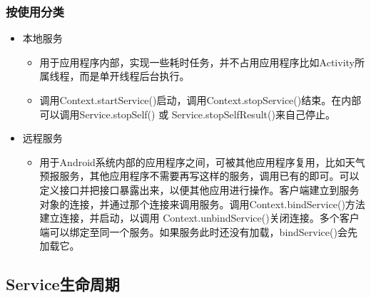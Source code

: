 \documentclass[9pt, b5paper]{article}
\begin{document}
\subsubsection{按使用分类　　}
\label{sec-3-3-2}
\begin{itemize}
\item 本地服务
\begin{itemize}
\item 用于应用程序内部，实现一些耗时任务，并不占用应用程序比如Activity所属线程，而是单开线程后台执行。
\item 调用Context.startService()启动，调用Context.stopService()结束。在内部可以调用Service.stopSelf() 或 Service.stopSelfResult()来自己停止。
\end{itemize}
\item 远程服务
\begin{itemize}
\item 用于Android系统内部的应用程序之间，可被其他应用程序复用，比如天气预报服务，其他应用程序不需要再写这样的服务，调用已有的即可。可以定义接口并把接口暴露出来，以便其他应用进行操作。客户端建立到服务对象的连接，并通过那个连接来调用服务。调用Context.bindService()方法建立连接，并启动，以调用 Context.unbindService()关闭连接。多个客户端可以绑定至同一个服务。如果服务此时还没有加载，bindService()会先加载它。
\end{itemize}
\end{itemize}
\subsection{Service生命周期}
\label{sec-3-4}
\end{document}
